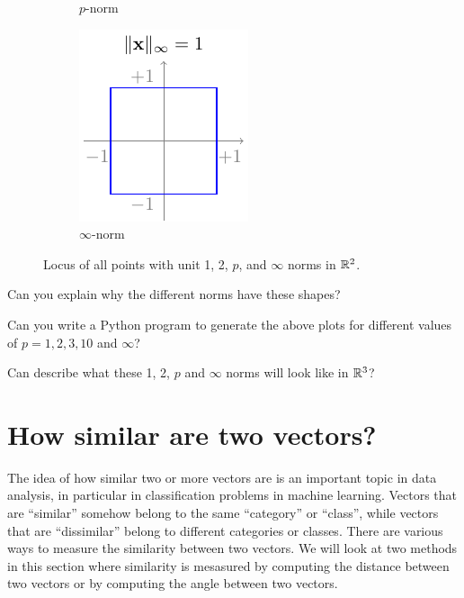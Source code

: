 \begin{figure}[h]
\begin{subfigure}[b]{0.24\textwidth}
        \caption{$p$-norm}
        \label{fig:normp}
    \end{subfigure}
    \begin{subfigure}[b]{0.24\textwidth}
        \centering
        \includegraphics{figure/chapter01/norminf.pdf}
        \caption{$\infty$-norm}
        \label{fig:norminf}
    \end{subfigure}
    \caption{Locus of all points with unit 1, 2, $p$, and $\infty$ norms in $\mathbb{R}^2$.}
\end{figure}

\begin{boxedstuff}
    \begin{problem}
        Can you explain why the different norms have these shapes? 
    \end{problem}
    \begin{problem}
        Can you write a Python program to generate the above plots for different values of $p = 1, 2, 3, 10$ and $\infty$?
    \end{problem}
    \begin{problem}
        Can describe what these 1, 2, $p$ and $\infty$ norms will look like in $\mathbb{R}^3$?
    \end{problem}
\end{boxedstuff}

\section{How similar are two vectors?}
The idea of how similar two or more vectors are is an important topic  in data analysis, in particular in classification problems in machine learning. Vectors that are ``similar'' somehow belong to the same ``category'' or ``class'', while vectors that are ``dissimilar'' belong to different categories or classes. There are various ways to measure the similarity between two vectors. We will look at two methods in this section where similarity is mesasured by computing the distance between two vectors or by computing the angle between two vectors.

